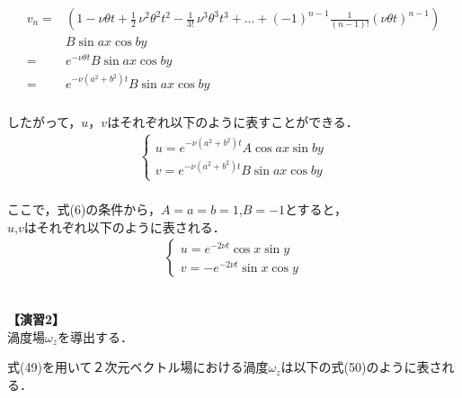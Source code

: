 \documentclass[12pt,a4paper]{jsarticle}
\begin{document}
\begin{eqnarray}
    \begin{aligned}
        v_n
        = &
        \left(
        1
        -
        \nu \theta t
        +
        \frac{1}{2}\,\nu^2 \theta^2 t^2
        -
        \frac{1}{3!}\,\nu^3 \theta^3 t^3
        +
        \dots
        +
        \left(
            -1
            \right)^{n-1}
        \frac{1}{
                \left(
                n-1
                \right)!
            }
        \left(
            \nu \theta t
            \right)^{n-1}
        \right)
        \\
          & B \sin ax \cos by
        \\
        = &
        e^{- \nu \theta t} B \sin ax \cos by
        \\
        = &
        e^{- \nu
                \left(
                a^2 +b^2
                \right)
                t} B \sin ax \cos by
    \end{aligned}
\end{eqnarray}
\\
したがって，$u$，$v$はそれぞれ以下のように表すことができる．
\begin{eqnarray}
    \begin{cases}
        {u = e^{- \nu
                    \left(
                    a^2 + b^2
                    \right) t}
            A \cos ax \sin by}
        \\
        {v =  e^{- \nu
                \left(
                a^2 +b^2
                \right)
                t} B \sin ax \cos by}
    \end{cases}
\end{eqnarray}
\\
ここで，式(6)の条件から，$A=a=b=1$,$B=-1$とすると，
\\
$u$,$v$はそれぞれ以下のように表される．
\begin{eqnarray}
    \begin{cases}
        {u = e^{- 2 \nu t}
            \cos x \sin y}
        \\
        {v = -e^{- 2 \nu t}
        \sin x \cos y}
    \end{cases}
\end{eqnarray}
\\
\begin{flushleft}
    {\large \textbf{【演習2】}\\
        渦度場$\omega_z$を導出する．} \\
\end{flushleft}
式(49)を用いて２次元ベクトル場における渦度$\omega_z$は以下の式(50)のように表される．\\
\end{document}
